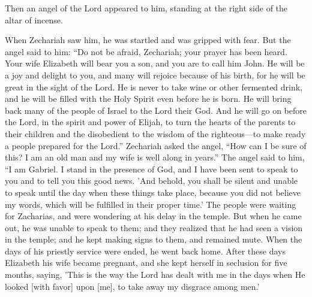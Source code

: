\begin{scripture}[Luke 1:11-25]
    Then an angel of the Lord appeared to him, standing at the right side of the altar of incense.
    \begin{poetry}
    When Zechariah saw him, he was startled and was gripped with fear. 
    But the angel said to him: “Do not be afraid, Zechariah; your prayer has been heard. Your wife Elizabeth will bear you a son, and you are to call him John. 
    He will be a joy and delight to you, and many will rejoice because of his birth, 
    for he will be great in the sight of the Lord. He is never to take wine or other fermented drink, and he will be filled with the Holy Spirit even before he is born. 
    He will bring back many of the people of Israel to the Lord their God. 
    And he will go on before the Lord, in the spirit and power of Elijah, to turn the hearts of the parents to their children and the disobedient to the wisdom of the righteous—to make ready a people prepared for the Lord.”
    Zechariah asked the angel, “How can I be sure of this? I am an old man and my wife is well along in years.”
    The angel said to him, “I am Gabriel. I stand in the presence of God, and I have been sent to speak to you and to tell you this good news. 
    'And behold, you shall be silent and unable to speak until the day when these things take place, because you did not believe my words, which will be fulfilled in their proper time.'
    The people were waiting for Zacharias, and were wondering at his delay in the temple.
    But when he came out, he was unable to speak to them; and they realized that he had seen a vision in the temple; and he kept making signs to them, and remained mute.
    When the days of his priestly service were ended, he went back home.
    After these days Elizabeth his wife became pregnant, and she kept herself in seclusion for five months, saying,
    'This is the way the Lord has dealt with me in the days when He looked [with favor] upon [me], to take away my disgrace among men.'
\end{poetry}

\end{scripture}

\vspace{2\baselineskip}


\newpage


